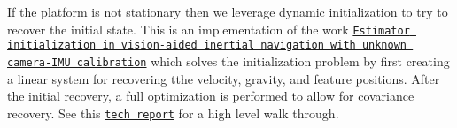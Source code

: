 If the platform is not stationary then we leverage dynamic initialization to try to recover the initial state. This is an implementation of the work \href{https://ieeexplore.ieee.org/document/6386235}{\tt Estimator initialization in vision-\/aided inertial navigation with unknown camera-\/\+I\+MU calibration} \cite{Dong2012IROS} which solves the initialization problem by first creating a linear system for recovering tthe velocity, gravity, and feature positions. After the initial recovery, a full optimization is performed to allow for covariance recovery. See this \href{https://pgeneva.com/downloads/reports/tr_init.pdf}{\tt tech report} for a high level walk through. 